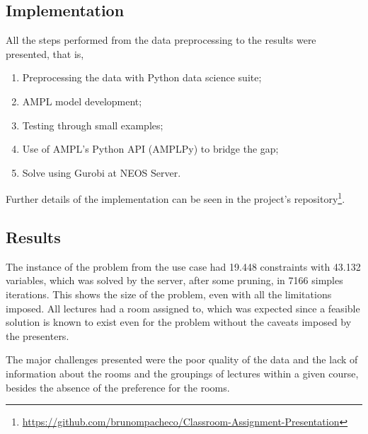 \subsection{Implementation}

All the steps performed from the data preprocessing to the results were presented, that is,
\begin{enumerate}
    \item Preprocessing the data with Python data science suite;
    \item AMPL model development;
    \item Testing through small examples;
    \item Use of AMPL's Python API (AMPLPy) to bridge the gap;
    \item Solve using Gurobi at NEOS Server.
\end{enumerate}

Further details of the implementation can be seen in the project's repository\footnote{\href{https://github.com/brunompacheco/Classroom-Assignment-Presentation}{https://github.com/brunompacheco/Classroom-Assignment-Presentation}}.

\subsection{Results}

The instance of the problem from the use case had 19.448 constraints with 43.132 variables, which was solved by the server, after some pruning, in 7166 simples iterations. This shows the size of the problem, even with all the limitations imposed. All lectures had a room assigned to, which was expected since a feasible solution is known to exist even for the problem without the caveats imposed by the presenters.

The major challenges presented were the poor quality of the data and the lack of information about the rooms and the groupings of lectures within a given course, besides the absence of the preference for the rooms.

